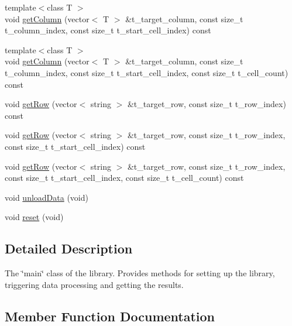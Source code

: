 \begin{DoxyCompactItemize}
{\footnotesize template$<$class T $>$ }\\void \hyperlink{classutils_1_1SlightCSV_aecaf786a3d34fe2354257eba9fd9afb1}{get\+Column} (vector$<$ T $>$ \&t\+\_\+target\+\_\+column, const size\+\_\+t t\+\_\+column\+\_\+index, const size\+\_\+t t\+\_\+start\+\_\+cell\+\_\+index) const
\item 
{\footnotesize template$<$class T $>$ }\\void \hyperlink{classutils_1_1SlightCSV_aac3086b7b5dcb402f03d7748c090a354}{get\+Column} (vector$<$ T $>$ \&t\+\_\+target\+\_\+column, const size\+\_\+t t\+\_\+column\+\_\+index, const size\+\_\+t t\+\_\+start\+\_\+cell\+\_\+index, const size\+\_\+t t\+\_\+cell\+\_\+count) const
\item 
void \hyperlink{classutils_1_1SlightCSV_a5c01d4b065101c784daf05b8916307b1}{get\+Row} (vector$<$ string $>$ \&t\+\_\+target\+\_\+row, const size\+\_\+t t\+\_\+row\+\_\+index) const
\item 
void \hyperlink{classutils_1_1SlightCSV_ac7ec9d6277e7c7e2cfa96782596dc6d6}{get\+Row} (vector$<$ string $>$ \&t\+\_\+target\+\_\+row, const size\+\_\+t t\+\_\+row\+\_\+index, const size\+\_\+t t\+\_\+start\+\_\+cell\+\_\+index) const
\item 
void \hyperlink{classutils_1_1SlightCSV_a95578bbb02cbc476e62814b1983da56a}{get\+Row} (vector$<$ string $>$ \&t\+\_\+target\+\_\+row, const size\+\_\+t t\+\_\+row\+\_\+index, const size\+\_\+t t\+\_\+start\+\_\+cell\+\_\+index, const size\+\_\+t t\+\_\+cell\+\_\+count) const
\item 
void \hyperlink{classutils_1_1SlightCSV_aaa9c8042d6231660cb08ada7c1a8dccb}{unload\+Data} (void)
\item 
void \hyperlink{classutils_1_1SlightCSV_abc28f1e33cc67dd5d4380254070ecf97}{reset} (void)
\end{DoxyCompactItemize}


\subsection{Detailed Description}
The \char`\"{}main\char`\"{} class of the library. Provides methods for setting up the library, triggering data processing and getting the results. 

\subsection{Member Function Documentation}
\mbox{\label{classutils_1_1SlightCSV_a1a95207d5d490c2c7d2ff74fab65ec1d}} 
